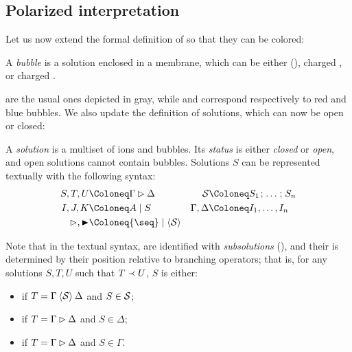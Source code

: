 \begin{scope}
\subsection{Polarized interpretation}

Let us now extend the formal definition of  so that they can be colored:

\begin{definition}[Bubble]
  A \emph{bubble} is a solution enclosed in a membrane, which can be either
   (), charged , or
  charged .
\end{definition}

  are the usual ones depicted in gray, while  and 
 correspond respectively to red and blue bubbles. We also update the
definition of solutions, which can now be open or closed:

\begin{definition}[Solution]
  
  A \emph{solution} is a multiset of ions and bubbles. Its \emph{status} is
  either \emph{closed} or \emph{open}, and open solutions cannot contain 
  bubbles. Solutions $S$ can be represented textually with the following syntax:
  \begin{align*}
    S, T, U &\Coloneq \Gamma \J \Delta &
    \cS &\Coloneq S_1 \sep \ldots \sep S_n \\
    I, J, K &\Coloneq A \mid S &
    \Gamma, \Delta &\Coloneq I_1, \ldots, I_n \\
    \J, \JB &\Coloneq {\seq} \mid {\piq{\cS}} &&
  \end{align*}
\end{definition}

Note that in the textual syntax,  are identified with \emph{subsolutions}
(), and their  is determined by their position
relative to branching operators; that is, for any solutions $S, T, U$ such that
$T \prec U$, $S$ is either:
\begin{itemize}
  \item \emph{} if $T = \Gamma \mathbin{\langle \mathcal{S} \rangle} \Delta$ and $S \in
  \mathcal{S}$;
  \item \emph{} if $T = \Gamma \mathbin{\rhd} \Delta$ and $S \in \Delta$;
  \item \emph{} if $T = \Gamma \mathbin{\rhd} \Delta$ and $S \in \Gamma$.
\end{itemize}


\end{scope}
